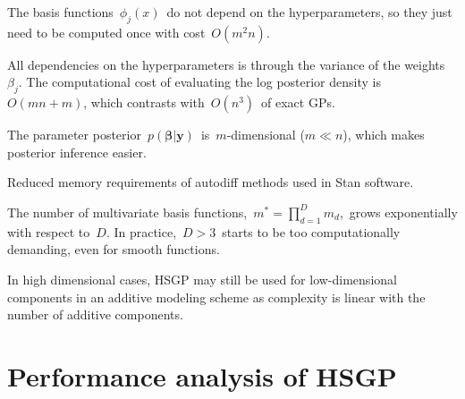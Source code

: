 \documentclass[landscape,a1,final]{a0poster} %
\let\tempone\itemize
\let\temptwo\enditemize
\renewenvironment{itemize}{\tempone\addtolength{\itemsep}{-0.3\baselineskip}}{\temptwo}
\begin{document}
\begin{minipage}{1\linewidth}
\begin{minipage}[t]{0.31\textwidth}
\vspace{-0.5cm}
\begin{tcolorbox}[colframe=blue!20, colback=white, title=\small \color{black!80} Properties of the HSGP model, colbacktitle=lightblue, coltitle=black, boxrule=0.5pt]
\begin{itemize}\setlength\itemsep{1mm}
\item[+] The basis functions\, $\phi_j(x)$\, do not depend on the hyperparameters, so they just need to be computed once with cost\, $O(m^2n)$.

\item[+]  All dependencies on the hyperparameters is through the variance of the weights\, $\beta_j$. The computational cost of evaluating the log posterior density is\, $O(mn+m)$, which contrasts with\, $O(n^3)$\, of exact GPs.


\item[+] The parameter posterior\, $p(\bm{\beta}|\bm{y})$\, is\, $m$-dimensional ($m\ll n$), which makes posterior inference easier.

\item[+] Reduced memory requirements of autodiff methods used in Stan software.


\item[-] The number of multivariate basis functions,\, $m^{\ast} = \prod_{d=1}^{D} m_d$,\, grows exponentially with respect to\, $D$. In practice,\, $D>3$\, starts to be too computationally demanding, even for smooth functions.

\item[+] In high dimensional cases, HSGP may still be used for low-dimensional components in an additive modeling scheme as complexity is linear with the number of additive components.

\end{itemize}
\end{tcolorbox}


\vspace{-0.5cm}
\section{Performance analysis of HSGP}
\vspace{-0.2cm}


\end{minipage}
\end{minipage}
\end{document}
